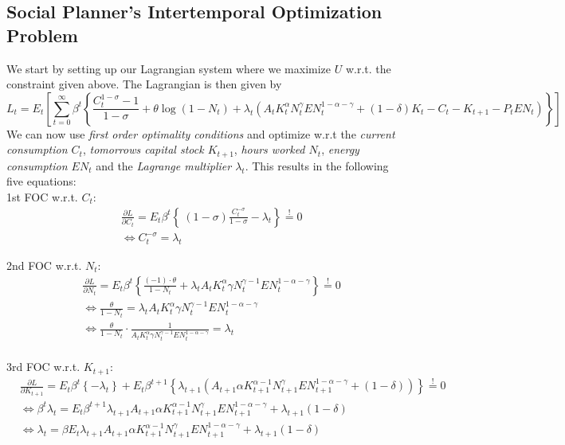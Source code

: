 \documentclass[a4paper,11pt]{article}
\begin{document}
\subsection{Social Planner's Intertemporal Optimization Problem}
We start by setting up our Lagrangian system where we maximize $U$ w.r.t. the constraint given above. The Lagrangian is then given by
$$L_t = E_t\left[\sum_{t=0}^\infty\beta^t\left\{\frac{C_t^{1-\sigma}-1}{1-\sigma}+\theta\log(1-N_t) + \lambda_t\left(A_tK_t^\alpha N_t^\gamma EN_t^{1-\alpha-\gamma} + (1-\delta)K_t - C_t - K_{t+1}-P_tEN_t\right) \right\} \right]$$
We can now use \textit{first order optimality conditions} and optimize w.r.t the \textit{current consumption $C_t$}, \textit{tomorrows capital stock $K_{t+1}$}, \textit{hours worked $N_t$}, \textit{energy consumption $EN_t$} and the \textit{Lagrange multiplier $\lambda_t$}. This results in the following five equations:\\

1st FOC w.r.t. $C_t$:
\begin{align*}
&\frac{\partial L}{\partial C_t}=E_t \beta^t\left\{\ (1-\sigma)\frac{C_t^{-\sigma}}{1-\sigma}-\lambda_t\right\} \overset{!}{=}0\\
&\iff C_t^{-\sigma}=\lambda_t
\end{align*}

2nd FOC w.r.t. $N_t$:
\begin{align*}
&\frac{\partial L}{\partial N_t}=E_t\beta^t\left\{ \frac{(-1)\cdot \theta}{1-N_t}+\lambda_tA_tK_t^\alpha \gamma N_t^{\gamma-1} EN_t^{1-\alpha-\gamma}\right\}\overset{!}{=}0\\
&\iff \frac{\theta}{1-N_t}=\lambda_tA_tK_t^\alpha \gamma N_t^{\gamma-1} EN_t^{1-\alpha-\gamma}\\
&\iff \frac{\theta}{1-N_t}\cdot \frac{1}{A_tK_t^\alpha \gamma N_t^{\gamma-1} EN_t^{1-\alpha-\gamma}}=\lambda_t\\
\end{align*}

3rd FOC w.r.t. $K_{t+1}$:
\begin{align*}
&\frac{\partial L}{\partial K_{t+1}} = E_t\beta^t\left\{ -\lambda_t \right\} +E_t \beta^{t+1} \left\{ \lambda_{t+1} (A_{t+1}\alpha K_{t+1}^{\alpha-1} N_{t+1}^\gamma EN_{t+1}^{1-\alpha-\gamma}+(1-\delta))\right\}\overset{!}{=}0\\
&\iff \beta^t \lambda_t = E_t\beta^{t+1} \lambda_{t+1}A_{t+1}\alpha K_{t+1}^{\alpha-1} N_{t+1}^\gamma EN_{t+1}^{1-\alpha-\gamma}+\lambda_{t+1}(1-\delta)\\
&\iff \lambda_t = \beta E_t \lambda_{t+1}A_{t+1}\alpha K_{t+1}^{\alpha-1} N_{t+1}^\gamma EN_{t+1}^{1-\alpha-\gamma}+\lambda_{t+1}(1-\delta)\\
\end{align*}
\end{document}
